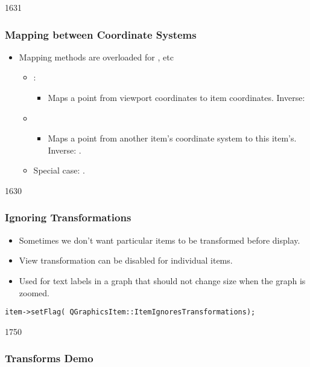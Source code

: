 \begin{slide}{1631}\frametitle{Mapping between Coordinate Systems}
\begin{itemize}
\item Mapping methods are overloaded for ,  etc
\begin{itemize}
\item {}:
    \begin{itemize}
    \item Maps a point from viewport coordinates to item coordinates. Inverse:  
    \end{itemize}

\item {}
    \begin{itemize}
    \item Maps a point from another item's coordinate system to this item's. Inverse:  .
    \end{itemize}
\item Special case: .
\end{itemize}

\end{itemize}
\end{slide}


\begin{slide}{1630}\frametitle{Ignoring Transformations}
\begin{itemize}
\item Sometimes we don't want particular items to be transformed before display.
\item View transformation can be disabled for individual items.
\item Used for text labels in a graph that should not change size when the graph is zoomed.
\end{itemize}
\small{
\texttt{item->setFlag( QGraphicsItem::ItemIgnoresTransformations);}
}


\end{slide}


\begin{slide}{1750}

\frametitle{Transforms Demo}


\end{slide}


